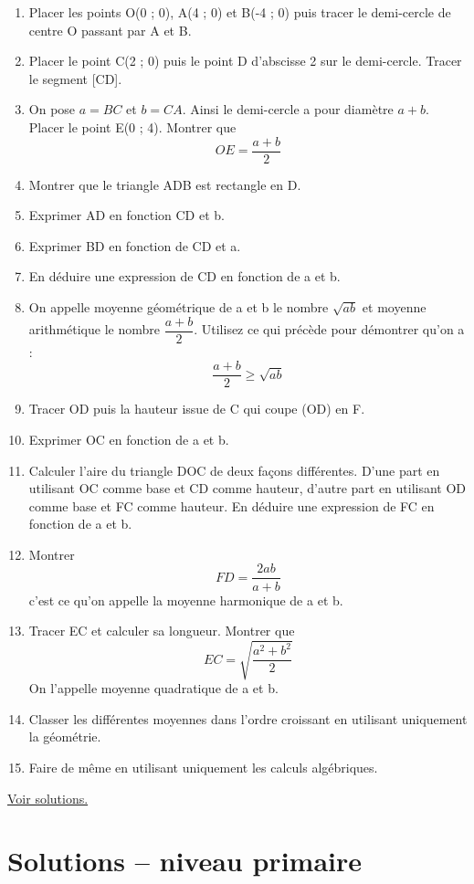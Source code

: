 \documentclass[11pt]{article}
\begin{document}
\begin{enumerate}
\item Placer les points O(0 ; 0), A(4 ; 0) et B(-4 ; 0) puis tracer le
demi-cercle de centre O passant par A et B.
\item Placer le point C(2 ; 0) puis le point D d'abscisse 2 sur le
demi-cercle. Tracer le segment [CD].
\item On pose \(a = BC\) et \(b = CA\). Ainsi le demi-cercle a pour diamètre
\(a + b\). Placer le point E(0 ; 4). Montrer que \[OE = \dfrac{a +
   b}{2}\]
\item Montrer que le triangle ADB est rectangle en D.
\item Exprimer AD en fonction CD et b.
\item Exprimer BD en fonction de CD et a.
\item En déduire une expression de CD en fonction de a et b.
\item On appelle moyenne géométrique de a et b le nombre \(\sqrt{ab}\) et
moyenne arithmétique le nombre \(\dfrac{a + b}{2}\). Utilisez ce qui
précède pour démontrer qu'on a : \[\dfrac{a+b}{2} \geq \sqrt{ab}\]
\item Tracer OD puis la hauteur issue de C qui coupe (OD) en F.
\item Exprimer OC en fonction de a et b.
\item Calculer l'aire du triangle DOC de deux façons différentes. D'une
part en utilisant OC comme base et CD comme hauteur, d'autre part
en utilisant OD comme base et FC comme hauteur. En déduire une
expression de FC en fonction de a et b.
\item Montrer \[FD = \dfrac{2ab}{a + b}\] c'est ce qu'on appelle la
moyenne harmonique de a et b.
\item Tracer EC et calculer sa longueur. Montrer que \[EC =
   \sqrt{\dfrac{a^2 + b^2}{2}}\]
On l'appelle moyenne quadratique de a et b.
\item Classer les différentes moyennes dans l'ordre croissant en
utilisant uniquement la géométrie.
\item Faire de même en utilisant uniquement les calculs algébriques.
\end{enumerate}

\hyperref[org9f7ca9d]{Voir solutions.}

\newpage

\section{Solutions – niveau primaire}
\label{sec:orgbe75972}
\end{document}

